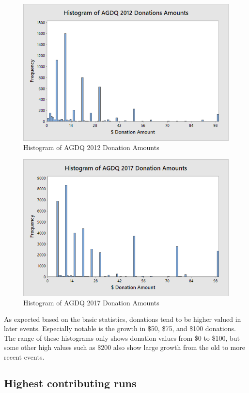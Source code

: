 \documentclass[journal]{IEEEtran}
\begin{document}
\begin{figure}
	\centering
	\includegraphics[scale=0.55]{AGDQ2012Histogram}
	\caption{Histogram of AGDQ 2012 Donation Amounts}
\end{figure}
\begin{figure}
	\centering
	\includegraphics[scale=0.55]{AGDQ2017Histogram}
	\caption{Histogram of AGDQ 2017 Donation Amounts}
\end{figure}

As expected based on the basic statistics, donations tend to be higher valued in later events. Especially notable is the growth in \$50, \$75, and \$100 donations. The range of these histograms only shows donation values from \$0 to \$100, but some other high values such as \$200 also show large growth from the old to more recent events.


\subsection{Highest contributing runs}
\end{document}
